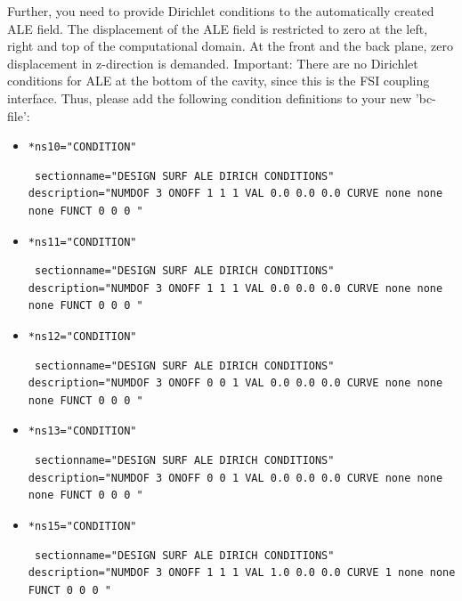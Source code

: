 Further, you need to provide Dirichlet conditions to the automatically created ALE field. The displacement of the 
ALE field is restricted to zero at the left, right and top of the computational domain. At the front and the back plane,
zero displacement in z-direction is demanded. Important: There are no Dirichlet conditions for ALE
at the bottom of the cavity, since this is the FSI coupling interface. Thus, please add the following condition definitions to your new 'bc-file':

\begin{itemize}
 \item \verb|*ns10="CONDITION"| 
\begin{small} \begin{verbatim} sectionname="DESIGN SURF ALE DIRICH CONDITIONS"
description="NUMDOF 3 ONOFF 1 1 1 VAL 0.0 0.0 0.0 CURVE none none none FUNCT 0 0 0 "
\end{verbatim} \end{small}

 \item \verb|*ns11="CONDITION"| 
\begin{small} \begin{verbatim} sectionname="DESIGN SURF ALE DIRICH CONDITIONS"
description="NUMDOF 3 ONOFF 1 1 1 VAL 0.0 0.0 0.0 CURVE none none none FUNCT 0 0 0 "
\end{verbatim} \end{small}

 \item \verb|*ns12="CONDITION"| 
\begin{small} \begin{verbatim} sectionname="DESIGN SURF ALE DIRICH CONDITIONS"
description="NUMDOF 3 ONOFF 0 0 1 VAL 0.0 0.0 0.0 CURVE none none none FUNCT 0 0 0 "
\end{verbatim} \end{small}

 \item \verb|*ns13="CONDITION"| 
\begin{small} \begin{verbatim} sectionname="DESIGN SURF ALE DIRICH CONDITIONS"
description="NUMDOF 3 ONOFF 0 0 1 VAL 0.0 0.0 0.0 CURVE none none none FUNCT 0 0 0 "
\end{verbatim} \end{small}

 \item \verb|*ns15="CONDITION"| 
\begin{small} \begin{verbatim} sectionname="DESIGN SURF ALE DIRICH CONDITIONS"
description="NUMDOF 3 ONOFF 1 1 1 VAL 1.0 0.0 0.0 CURVE 1 none none FUNCT 0 0 0 "
\end{verbatim} \end{small}


\end{itemize}

